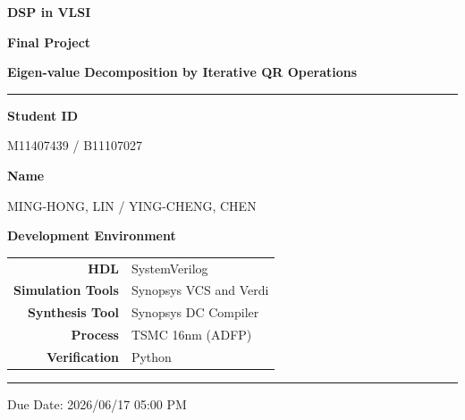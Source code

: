 \documentclass[12pt,a4paper]{report}
\begin{document}
\pagestyle{plain}

\begin{titlepage}
\centering
\vspace*{3cm}

{\fontsize{28}{34}\selectfont\bfseries DSP in VLSI\par}
\vspace{0.6em}
{\fontsize{20}{26}\selectfont\bfseries Final Project\par}
\vspace{0.4em}
{\fontsize{16}{22}\selectfont\bfseries Eigen-value Decomposition by Iterative QR Operations\par}

\vspace{1.5cm}
\textcolor{crimson}{\rule{0.6\linewidth}{1.2pt}}
\vspace{1.5cm}

{\large\bfseries Student ID}\par
\vspace{0.4em}
{\large M11407439 / B11107027}\par

\vspace{0.8em}

{\large\bfseries Name}\par
\vspace{0.4em}
{\large MING-HONG, LIN / YING-CHENG, CHEN }\par

\vspace{2cm}

{\large\bfseries Development Environment}\par
\vspace{0.8em}
\begin{tabular}{rl}
    \textbf{HDL}              & SystemVerilog \\[4pt]
    \textbf{Simulation Tools} & Synopsys VCS and Verdi \\[4pt]
    \textbf{Synthesis Tool}   & Synopsys DC Compiler \\[4pt]
    \textbf{Process}          & TSMC 16nm (ADFP) \\[4pt]
    \textbf{Verification}     & Python \\
\end{tabular}

\vfill

\textcolor{crimson}{\rule{0.6\linewidth}{0.6pt}}\par
\vspace{0.5em}
{\small Due Date: 2026/06/17 05:00 PM}

\end{titlepage}
\end{document}
